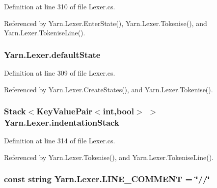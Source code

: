 Definition at line 310 of file Lexer.\-cs.



Referenced by Yarn.\-Lexer.\-Enter\-State(), Yarn.\-Lexer.\-Tokenise(), and Yarn.\-Lexer.\-Tokenise\-Line().

\hypertarget{a00129_a16b5dbf27a377cde5e8ba0eaa05b5710}{
\subsubsection[{default\-State}]{ Yarn.\-Lexer.\-default\-State\hspace{0.3cm}{\ttfamily [private]}}}\label{a00129_a16b5dbf27a377cde5e8ba0eaa05b5710}


Definition at line 309 of file Lexer.\-cs.



Referenced by Yarn.\-Lexer.\-Create\-States(), and Yarn.\-Lexer.\-Tokenise().

\hypertarget{a00129_a6631a1b1a9109258ab18927e7587ff9b}{
\subsubsection[{indentation\-Stack}]{\setlength{\rightskip}{0pt plus 5cm}Stack$<$Key\-Value\-Pair$<$int,bool$>$ $>$ Yarn.\-Lexer.\-indentation\-Stack\hspace{0.3cm}{\ttfamily [private]}}}\label{a00129_a6631a1b1a9109258ab18927e7587ff9b}


Definition at line 314 of file Lexer.\-cs.



Referenced by Yarn.\-Lexer.\-Tokenise(), and Yarn.\-Lexer.\-Tokenise\-Line().

\hypertarget{a00129_a29c457125cc4876f8571f5d9afa372e2}{
\subsubsection[{L\-I\-N\-E\-\_\-\-C\-O\-M\-M\-E\-N\-T}]{\setlength{\rightskip}{0pt plus 5cm}const string Yarn.\-Lexer.\-L\-I\-N\-E\-\_\-\-C\-O\-M\-M\-E\-N\-T = \char`\"{}//\char`\"{}\hspace{0.3cm}{\ttfamily [private]}}}\label{a00129_a29c457125cc4876f8571f5d9afa372e2}


